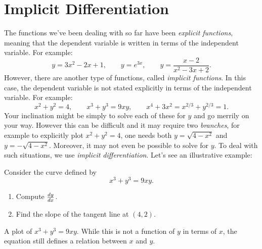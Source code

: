 \section{Implicit Differentiation}

The functions we've been dealing with so far have been
\textit{explicit functions}, meaning that the
dependent variable is written in terms of the independent variable. For
example:
\[
y=3x^2-2x+1,\qquad y=e^{3x}, \qquad y = \frac{x-2}{x^2-3x+2}.
\]
However, there are another type of functions, called \textit{implicit functions}. In this case, the dependent
variable is not stated explicitly in terms of the independent
variable. For example:
\[
x^2+y^2 = 4,\qquad x^3+y^3 = 9xy, \qquad x^4+3x^2 = x^{2/3}+y^{2/3} = 1.
\]
Your inclination might be simply to solve each of these for $y$ and go
merrily on your way. However this can be difficult and it may require
two \textit{branches}, for example to explicitly plot $x^2+y^2 = 4$,
one needs both $y= \sqrt{4-x^2}$ and $y=-\sqrt{4-x^2}$. Moreover, it
may not even be possible to solve for $y$. To deal with such
situations, we use \textit{implicit
  differentiation}. Let's see an illustrative example:


\begin{example}
Consider the curve defined by
\[
x^3+y^3 = 9xy.
\]
\begin{enumerate}
\item Compute $\frac{dy}{dx}$.
\item Find the slope of the tangent line at $(4,2)$.
\end{enumerate}
\end{example}


\begin{marginfigure}
\caption{A plot of $x^3+y^3 = 9xy$. While this is not a function of
  $y$ in terms of $x$, the equation still defines a relation between
  $x$ and $y$.}
\end{marginfigure}

